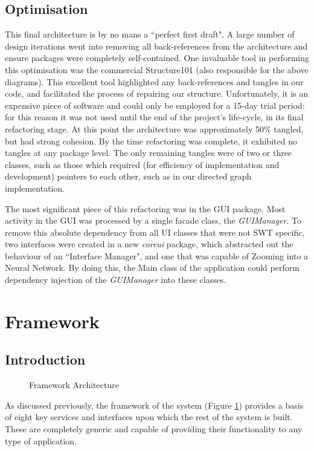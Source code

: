 \documentclass{acm_proc_article-sp}
\begin{document}
\subsection{Optimisation}
{
This final architecture is by no mans a ``perfect first draft". A large number of design iterations went into removing all back{}-references from the architecture and ensure packages were completely self{}-contained. One invaluable tool in performing this optimisation was the commercial Structure101\cite{structure101} (also responsible for the above diagrams). This excellent tool highlighted any back{}-references and tangles in our code, and facilitated the process of repairing our structure. Unfortunately, it is an expensive piece of software and could only be employed for a 15{}-day trial period; for this reason it was not used until the end of the project's life{}-cycle, in its final refactoring stage. At this point the architecture was approximately 50\% tangled, but had strong cohesion. By the time refactoring was complete, it exhibited no tangles at any package level. The only remaining tangles were of two or three classes, such as those which required (for efficiency of implementation and development) pointers to each other, such as in our directed graph implementation.

The most significant piece of this refactoring was in the GUI package. Most activity in the GUI was processed by a single facade class, the {\textit{GUIManager}}. To remove this absolute dependency from all UI classes that were not SWT specific, two interfaces were created in a new {\textit{coreui}} package, which abstracted out the behaviour of an ``Interface Manager", and one that was capable of Zooming into a Neural Network. By doing this, the Main class of the application could perform dependency injection of the {\textit{GUIManager}} into these classes.
}

\section{Framework}
\subsection{Introduction}
{
\begin{figure}[t]
\centering
{}
\caption{Framework Architecture}
\label{fig:framework:arch}
\end{figure}
As discussed previously, the framework of the system (Figure \ref{fig:framework:arch}) provides a basis of eight key services and interfaces upon which the rest of the system is built. These are completely generic and capable of providing their functionality to any type of application.
}
\end{document}
